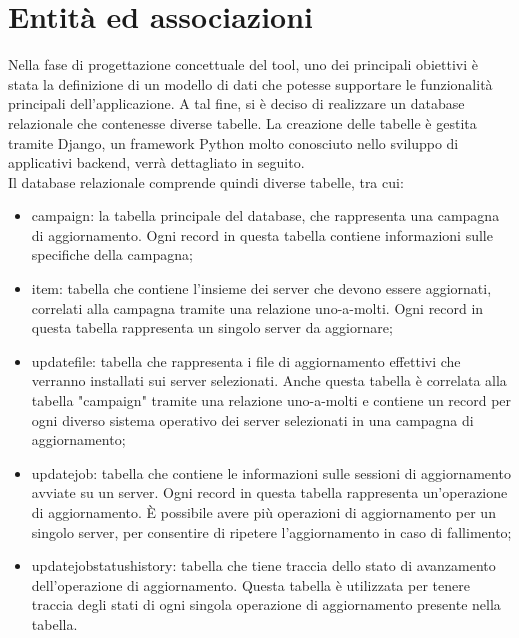 %
%
\section{Entità ed associazioni}
Nella fase di progettazione concettuale del tool, uno dei principali
obiettivi è stata la definizione di un modello di dati che potesse 
supportare le funzionalità principali dell'applicazione.
A tal fine, si è deciso di realizzare un database relazionale che 
contenesse diverse tabelle. La creazione delle tabelle è gestita 
tramite Django, un framework Python molto conosciuto nello sviluppo di 
applicativi backend, verrà dettagliato in seguito.\\

Il database relazionale comprende quindi diverse tabelle, tra cui:
\begin{itemize}
\item campaign: la tabella principale del database, che rappresenta una 
campagna di aggiornamento. Ogni record in questa tabella contiene 
informazioni sulle specifiche della campagna;
\item item: tabella che contiene l'insieme dei server che devono essere 
aggiornati, correlati alla campagna tramite una relazione uno-a-molti. 
Ogni record in questa tabella rappresenta un singolo server da aggiornare;
\item updatefile: tabella che rappresenta i file di aggiornamento 
effettivi che verranno installati sui server selezionati. 
Anche questa tabella è correlata alla tabella "campaign" tramite una 
relazione uno-a-molti e contiene un record per ogni diverso sistema 
operativo dei server selezionati in una campagna di aggiornamento;
\item updatejob: tabella che contiene le informazioni sulle sessioni 
di aggiornamento avviate su un server. Ogni record in questa tabella 
rappresenta un'operazione di aggiornamento. È possibile avere più operazioni 
di aggiornamento per un singolo server, per consentire di ripetere 
l’aggiornamento in caso di fallimento;
\item updatejobstatushistory: tabella che tiene traccia dello stato di 
avanzamento dell’operazione di aggiornamento. Questa tabella è utilizzata 
per tenere traccia degli stati di ogni singola operazione di aggiornamento 
presente nella tabella.
\end{itemize}

